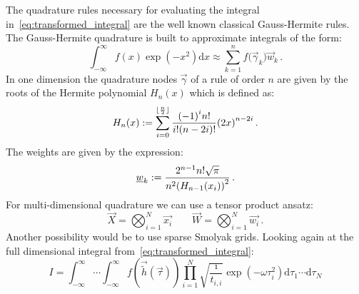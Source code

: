 \documentclass[a4paper,10pt]{article}
\begin{document}
The quadrature rules necessary for evaluating the integral
in~\eqref{eq:transformed_integral} are the well known
classical Gauss-Hermite rules. The Gauss-Hermite quadrature
is built to approximate integrals of the form:
\begin{equation}
  \int_{-\infty}^\infty f\left(x\right) \exp(-x^2) \mathrm{d}x
  \approx
  \sum_{k=1}^n f\bigl(\vec{\gamma}_k\bigr) \vec{w}_k \,.
\end{equation}
In one dimension the quadrature nodes $\vec{\gamma}$ of a rule of
order $n$ are given by the roots of the Hermite polynomial $H_n(x)$
which is defined as:
\begin{equation}
  H_n(x) := \sum_{i=0}^{\lfloor\frac{n}{2}\rfloor}
                   \frac{{(-1)}^i n!}{i!(n-2i)!} {(2x)}^{n-2i} \,.
\end{equation}
The weights are given by the expression:
\begin{equation}
  \underline{w}_k := \frac{2^{n-1} n! \sqrt{\pi}}{n^2 {\left(H_{n-1}(x_i)\right)}^2} \,.
\end{equation}
For multi-dimensional quadrature we can use a tensor product ansatz:
\begin{equation}
  \vec{X} = \bigotimes_{i=1}^N \vec{x_i} \quad\quad
  \vec{W} = \bigotimes_{i=1}^N \vec{w_i} \,.
\end{equation}
Another possibility would be to use sparse Smolyak grids.
Looking again at the full dimensional integral from~\eqref{eq:transformed_integral}:
\begin{equation}
 I = \int_{-\infty}^\infty \cdots \int_{-\infty}^\infty
       f\left(\vec{\tilde{h}}(\vec{\tau})\right)
       \prod_{i=1}^N \sqrt{\frac{\imath}{t_{i,i}}}
                     \exp\left(-\omega \tau_i^2\right)
    \mathrm{d}\tau_1 \cdots \mathrm{d}\tau_N
\end{equation}
\end{document}
